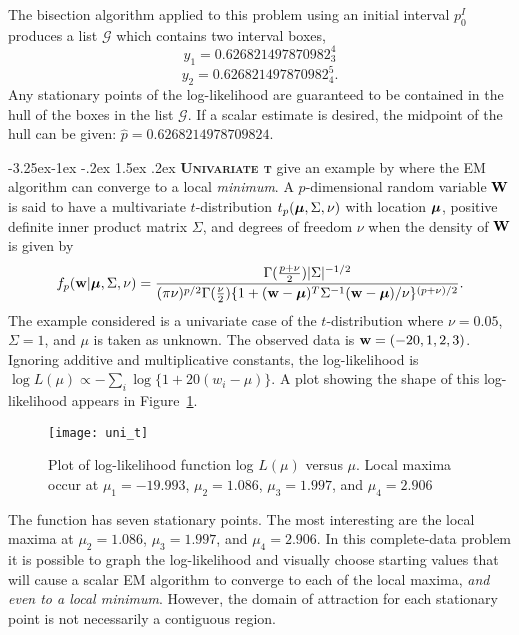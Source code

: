 \documentclass[10pt,twoside]{article}
\makeatletter
\renewcommand\subsection{\@startsection{subsection}{2}{\z@}%
                 {-3.25ex\@plus -1ex \@minus -.2ex}%
                 {1.5ex \@plus .2ex}%
                 {\scshape\centering\bfseries}} %
\makeatother
\begin{document}
The bisection algorithm applied to this problem using an initial interval
$p_0^I$
produces a list
$\mathcal{G}$ which contains two interval boxes,
$$y_1 = 0.626821497870982_3^4$$
$$y_2 = 0.626821497870982_4^5.$$
Any stationary points of the log-likelihood are guaranteed to be
contained in the hull of the boxes in the list $\mathcal{G}$.  If a
scalar estimate is desired, the midpoint of the hull can be given:
$\hat{p} = 0.6268214978709824$.

\subsection{\textsc \bf Univariate t}
\cite{McLachlan:Book} give an example by \cite{Arslan} where the EM
algorithm
can converge to a local {\it minimum}.  
A $p$-dimensional random variable ${\bf W}$ is 
said to have a multivariate $t$-distribution $t_p(\mbox{\boldmath $\mu$}, \Sigma, \nu)$ with
location $\mbox{\boldmath $\mu$}$, positive definite inner product matrix $\Sigma$, and
degrees
of freedom $\nu$ when the density of ${\bf W}$ is given by
\begin{equation}
f_p({\bf w} | \mbox{\boldmath $\mu$}, \Sigma, \nu) =
\frac{\Gamma(\frac{p+\nu}{2})|\Sigma|^{-1/2}}
  {(\pi \nu)^{p/2} \Gamma(\frac{\nu}{2}) 
  \{ 1 + ({\bf w}-\mbox{\boldmath $\mu$})^T\Sigma^{-1}({\bf w}-\mbox{\boldmath $\mu$}) / \nu\}^{(p+\nu)/2}}.
\end{equation}
The example considered is a univariate case of the $t$-distribution where
$\nu=0.05$, $\Sigma=1$, and $\mu$ is taken as unknown.  The observed data is
${\bf w}=(-20,1,2,3)$.  Ignoring additive and multiplicative constants, the
log-likelihood is
$\log L(\mu) \propto -\sum_i \log \{1+20(w_i - \mu)\}$.  A plot showing the
shape of this log-likelihood appears in Figure~\ref{unitlike}.
\begin{figure}[ht]
\begin{center}
\resizebox{11 cm}{10 cm} {\texttt{[image: uni\_t]}}
\caption{Plot of log-likelihood function log $L(\mu)$ versus $\mu$.  Local 
maxima occur at $\mu_1= -19.993$, $\mu_2= 1.086$, $\mu_3=1.997$, 
and $\mu_4=2.906$\label{unitlike} }
\end{center}
\end{figure}

The function has seven stationary points.  The most interesting are the
local maxima at
$\mu_2= 1.086$, $\mu_3=1.997$, and $\mu_4=2.906$.  In this complete-data
problem it is possible to graph the log-likelihood and visually choose
starting values that will cause a scalar EM algorithm to converge to each 
of the local
maxima, {\it and even to a local minimum}.  However, the domain of
attraction
for each stationary point is not necessarily a contiguous region.
\end{document}
